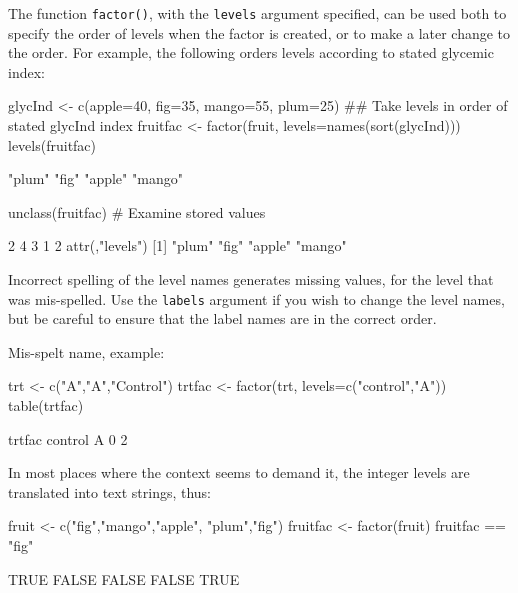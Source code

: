 \documentclass{tufte-book}\usepackage[]{graphicx}\usepackage[]{color}
\newcommand{\txtt}[1]{\texttt{#1}}
\begin{document}
The function \txtt{factor()}, with the \txtt{levels} argument
specified, can be used both to specify the order of levels when the
factor is created, or to make a later change to the
order.  For example, the following
orders levels according to stated glycemic index:
\begin{Schunk}
\begin{Sinput}
glycInd <- c(apple=40, fig=35, mango=55, plum=25)
## Take levels in order of stated glycInd index
fruitfac <- factor(fruit,
                   levels=names(sort(glycInd)))
levels(fruitfac)
\end{Sinput}
\begin{Soutput}
[1] "plum"  "fig"   "apple" "mango"
\end{Soutput}
\begin{Sinput}
unclass(fruitfac)  # Examine stored values
\end{Sinput}
\begin{Soutput}
[1] 2 4 3 1 2
attr(,"levels")
[1] "plum"  "fig"   "apple" "mango"
\end{Soutput}
\end{Schunk}

Incorrect spelling of the level names generates missing values, for
the level that was mis-spelled.  Use the \txtt{labels} argument if you
wish to change the level names, but be careful to ensure that the
label names are in the correct order.
\begin{marginfigure}[-36pt]
Mis-spelt name, example:
\begin{Schunk}
\begin{Sinput}
trt <- c("A","A","Control")
trtfac <- factor(trt,
  levels=c("control","A"))
table(trtfac)
\end{Sinput}
\begin{Soutput}
trtfac
control       A 
      0       2 
\end{Soutput}
\end{Schunk}
\end{marginfigure}

In most places where the context seems to demand it, the integer levels
are translated into text strings, thus:
\begin{Schunk}
\begin{Sinput}
fruit <- c("fig","mango","apple", "plum","fig")
fruitfac <- factor(fruit)
fruitfac == "fig"
\end{Sinput}
\begin{Soutput}
[1]  TRUE FALSE FALSE FALSE  TRUE
\end{Soutput}
\end{Schunk}
\end{document}
